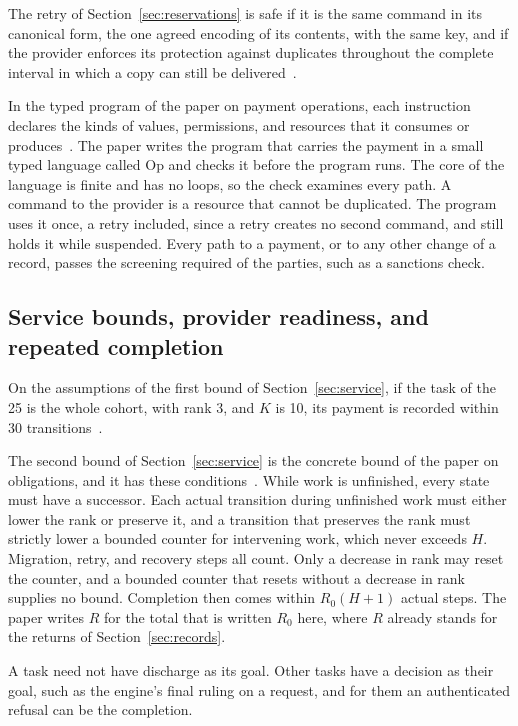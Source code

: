 \documentclass{momentum}
\begin{document}
The retry of Section~\ref{sec:reservations} is safe if it is the same command in its canonical form, the one agreed encoding of its contents, with the same key, and if the provider enforces its protection against duplicates throughout the complete interval in which a copy can still be delivered~\cite[Section~5.12]{op}.

In the typed program of the paper on payment operations, each instruction declares the kinds of values, permissions, and resources that it consumes or produces~\cite[Sections~3 and~4]{op}. The paper writes the program that carries the payment in a small typed language called Op and checks it before the program runs. The core of the language is finite and has no loops, so the check examines every path. A command to the provider is a resource that cannot be duplicated. The program uses it once, a retry included, since a retry creates no second command, and still holds it while suspended. Every path to a payment, or to any other change of a record, passes the screening required of the parties, such as a sanctions check.

\subsection{Service bounds, provider readiness, and repeated completion}
\label{sec:conditions-service}

On the assumptions of the first bound of Section~\ref{sec:service}, if the task of the 25 is the whole cohort, with rank 3, and $K$ is 10, its payment is recorded within 30 transitions~\cite[Theorem~7.15]{aot}.

The second bound of Section~\ref{sec:service} is the concrete bound of the paper on obligations, and it has these conditions~\cite[Theorem~7.18]{aot}. While work is unfinished, every state must have a successor. Each actual transition during unfinished work must either lower the rank or preserve it, and a transition that preserves the rank must strictly lower a bounded counter for intervening work, which never exceeds $H$. Migration, retry, and recovery steps all count. Only a decrease in rank may reset the counter, and a bounded counter that resets without a decrease in rank supplies no bound. Completion then comes within $R_0(H+1)$ actual steps. The paper writes $R$ for the total that is written $R_0$ here, where $R$ already stands for the returns of Section~\ref{sec:records}.

A task need not have discharge as its goal. Other tasks have a decision as their goal, such as the engine's final ruling on a request, and for them an authenticated refusal can be the completion.
\end{document}
